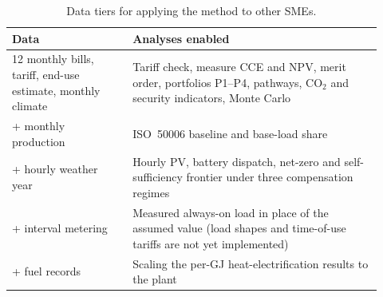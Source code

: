 \documentclass[processes,article,submit,pdftex,moreauthors]{Definitions/mdpi}
\begin{document}
\begin{table}[H]
\centering
\caption{Data tiers for applying the method to other SMEs.}
\label{tab:datatiers}
\footnotesize
\begin{tabular}{p{0.30\linewidth}p{0.62\linewidth}}
\toprule
Data & Analyses enabled \\
\midrule
12 monthly bills, tariff, end-use estimate, monthly climate & Tariff check, measure CCE and NPV, merit order, portfolios P1--P4, pathways, CO$_2$ and security indicators, Monte Carlo \\
+ monthly production & ISO~50006 baseline and base-load share \\
+ hourly weather year & Hourly PV, battery dispatch, net-zero and self-sufficiency frontier under three compensation regimes \\
+ interval metering & Measured always-on load in place of the assumed value (load shapes and time-of-use tariffs are not yet implemented) \\
+ fuel records & Scaling the per-GJ heat-electrification results to the plant \\
\bottomrule
\end{tabular}
\end{table}
\end{document}
